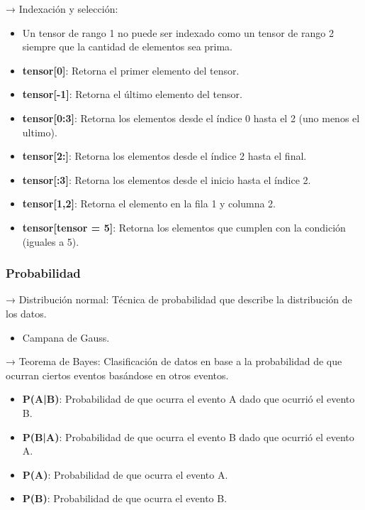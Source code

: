 \documentclass{templateNote}
\begin{document}
 → Indexación y selección: 
\begin{itemize}
    \item Un tensor de rango 1 no puede ser indexado como un tensor de rango 2 siempre que la cantidad de elementos sea prima.
    \item \textbf{tensor[0]}: Retorna el primer elemento del tensor.
    \item \textbf{tensor[-1]}: Retorna el último elemento del tensor.
    \item \textbf{tensor[0:3]}: Retorna los elementos desde el índice 0 hasta el 2 (uno menos el ultimo).
    \item \textbf{tensor[2:]}: Retorna los elementos desde el índice 2 hasta el final.
    \item \textbf{tensor[:3]}: Retorna los elementos desde el inicio hasta el índice 2.
    \item \textbf{tensor[1,2]}: Retorna el elemento en la fila 1 y columna 2.
    \item \textbf{tensor[tensor = 5]}: Retorna los elementos que cumplen con la condición (iguales a 5).
\end{itemize}

\subsubsection*{Probabilidad}

 → Distribución normal: Técnica de probabilidad que describe la distribución de los datos.

\begin{itemize}
    \item Campana de Gauss.
\end{itemize}


 → Teorema de Bayes: Clasificación de datos en base a la probabilidad de que ocurran ciertos eventos basándose en otros eventos.

\begin{itemize}
    \item \textbf{P(A|B)}: Probabilidad de que ocurra el evento A dado que ocurrió el evento B.
    \item \textbf{P(B|A)}: Probabilidad de que ocurra el evento B dado que ocurrió el evento A.
    \item \textbf{P(A)}: Probabilidad de que ocurra el evento A.
    \item \textbf{P(B)}: Probabilidad de que ocurra el evento B.
\end{itemize}
\end{document}
